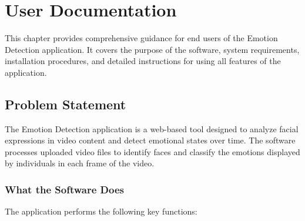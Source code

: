 \chapter{User Documentation}
\label{chap:user-documentation}

This chapter provides comprehensive guidance for end users of the Emotion Detection application. It covers the purpose of the software, system requirements, installation procedures, and detailed instructions for using all features of the application.

\section{Problem Statement}
\label{sec:problem-statement}

The Emotion Detection application is a web-based tool designed to analyze facial expressions in video content and detect emotional states over time. The software processes uploaded video files to identify faces and classify the emotions displayed by individuals in each frame of the video.

\subsection{What the Software Does}

The application performs the following key functions:

